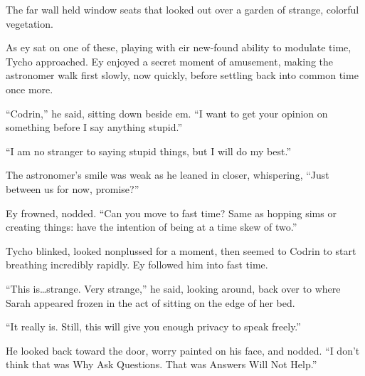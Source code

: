 The far wall held window seats that looked out over a garden of strange, colorful vegetation.

As ey sat on one of these, playing with eir new-found ability to modulate time, Tycho approached. Ey enjoyed a secret moment of amusement, making the astronomer walk first slowly, now quickly, before settling back into common time once more.

``Codrin,'' he said, sitting down beside em. ``I want to get your opinion on something before I say anything stupid.''

``I am no stranger to saying stupid things, but I will do my best.''

The astronomer's smile was weak as he leaned in closer, whispering, ``Just between us for now, promise?''

Ey frowned, nodded. ``Can you move to fast time? Same as hopping sims or creating things: have the intention of being at a time skew of two.''

Tycho blinked, looked nonplussed for a moment, then seemed to Codrin to start breathing incredibly rapidly. Ey followed him into fast time.

``This is\ldots strange. Very strange,'' he said, looking around, back over to where Sarah appeared frozen in the act of sitting on the edge of her bed.

``It really is. Still, this will give you enough privacy to speak freely.''

He looked back toward the door, worry painted on his face, and nodded. ``I don't think that was Why Ask Questions. That was Answers Will Not Help.''
